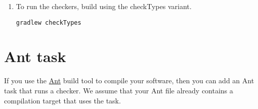 \begin{enumerate}
\item To run the checkers, build using the checkTypes variant.
\begin{Verbatim}
gradlew checkTypes
\end{Verbatim}

\end{enumerate}


\section{Ant task\label{ant-task}}

If you use the \href{http://ant.apache.org/}{Ant} build tool to compile
your software, then you can add an Ant task that runs a checker.  We assume
that your Ant file already contains a compilation target that uses the
 task.

